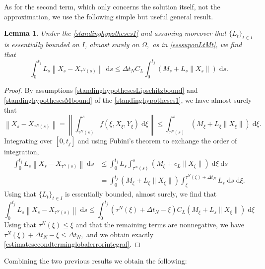 \documentclass[reqno,12pt]{amsart}
\theoremstyle{plain} %
\newtheorem{lemma}{Lemma}[section]
\theoremstyle{definition} %
\begin{document}
As for the second term, which only concerns the solution itself, not the approximation, we use the following simple but useful general result.

\begin{lemma}
    \label{lemestimatesecondterminglobalerror}
    Under the \cref{standinghypotheses1} and assuming moreover that $\{L_t\}_{t\in I}$ is essentially bounded on $I$, almost surely on $\Omega,$ as in \eqref{esssuponLtMt}, we find that
    \begin{equation}
        \label{estimatesecondterminglobalerrorintegral}
        \int_0^{t_j}L_s\left\|X_s - X_{\tau^N(s)}\right\| \;\mathrm{d}s \leq \Delta t_N C_L \int_0^{t_j} (M_s + L_s\|X_s\|) \;\mathrm{d}s.
    \end{equation}
\end{lemma}

\begin{proof}
    By assumptions \eqref{standinghypothesesLipschitzbound} and \eqref{standinghypothesesMbound} of the \cref{standinghypotheses1}, we have almost surely that
    \[
      \left\|X_s - X_{\tau^N(s)}\right\| = \left\|\int_{\tau^N(s)}^s f(\xi, X_\xi, Y_\xi)\;\mathrm{d}\xi\right\| \leq \int_{\tau^N(s)}^s (M_\xi + L_\xi\|X_\xi\|)\;\mathrm{d}\xi.
    \]
    Integrating over $[0, t_j]$ and using Fubini's theorem to exchange the order of integration,
    \begin{align*}
        \int_0^{t_j}L_s\left\|X_s - X_{\tau^N(s)}\right\| \;\mathrm{d}s & \leq \int_0^{t_j}L_s\int_{\tau^N(s)}^s (M_\xi + c_L\|X_\xi\|) \;\mathrm{d}\xi \;\mathrm{d}s \\
        & = \int_0^{t_j}(M_\xi + L_\xi\|X_\xi\|) \int_\xi^{\tau^N(\xi) + \Delta t_N} L_s\;\mathrm{d}s \;\mathrm{d}\xi.
    \end{align*}
    Using that $\{L_t\}_{t\in I}$ is essentially bounded, almost surely, we find that
    \[
        \int_0^{t_j}L_s\left\|X_s - X_{\tau^N(s)}\right\| \;\mathrm{d}s \leq \int_0^{t_j} (\tau^N(\xi) + \Delta t_N - \xi) C_L(M_\xi + L_s\|X_\xi\|) \;\mathrm{d}\xi
    \]
    Using that $\tau^N(\xi) \leq \xi$ and that the remaining terms are nonnegative, we have $\tau^N(\xi) + \Delta t_N - \xi \leq \Delta t_N,$ and we obtain exactly \eqref{estimatesecondterminglobalerrorintegral}.
\end{proof}

Combining the two previous results we obtain the following:
\end{document}
